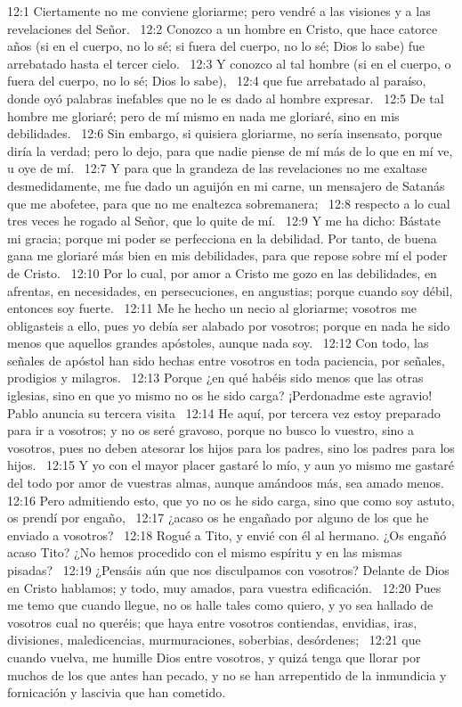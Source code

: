 12:1 Ciertamente no me conviene gloriarme; pero vendré a las visiones y a las revelaciones del Señor.  
12:2 Conozco a un hombre en Cristo, que hace catorce años (si en el cuerpo, no lo sé; si fuera del cuerpo, no lo sé; Dios lo sabe) fue arrebatado hasta el tercer cielo.  
12:3 Y conozco al tal hombre (si en el cuerpo, o fuera del cuerpo, no lo sé; Dios lo sabe),  
12:4 que fue arrebatado al paraíso, donde oyó palabras inefables que no le es dado al hombre expresar.  
12:5 De tal hombre me gloriaré; pero de mí mismo en nada me gloriaré, sino en mis debilidades.  
12:6 Sin embargo, si quisiera gloriarme, no sería insensato, porque diría la verdad; pero lo dejo, para que nadie piense de mí más de lo que en mí ve, u oye de mí.  
12:7 Y para que la grandeza de las revelaciones no me exaltase desmedidamente, me fue dado un aguijón en mi carne, un mensajero de Satanás que me abofetee, para que no me enaltezca sobremanera;  
12:8 respecto a lo cual tres veces he rogado al Señor, que lo quite de mí.  
12:9 Y me ha dicho: Bástate mi gracia; porque mi poder se perfecciona en la debilidad. Por tanto, de buena gana me gloriaré más bien en mis debilidades, para que repose sobre mí el poder de Cristo.  
12:10 Por lo cual, por amor a Cristo me gozo en las debilidades, en afrentas, en necesidades, en persecuciones, en angustias; porque cuando soy débil, entonces soy fuerte.  
12:11 Me he hecho un necio al gloriarme; vosotros me obligasteis a ello, pues yo debía ser alabado por vosotros; porque en nada he sido menos que aquellos grandes apóstoles, aunque nada soy.  
12:12 Con todo, las señales de apóstol han sido hechas entre vosotros en toda paciencia, por señales, prodigios y milagros.  
12:13 Porque ¿en qué habéis sido menos que las otras iglesias, sino en que yo mismo no os he sido carga? ¡Perdonadme este agravio!  
Pablo anuncia su tercera visita  
12:14 He aquí, por tercera vez estoy preparado para ir a vosotros; y no os seré gravoso, porque no busco lo vuestro, sino a vosotros, pues no deben atesorar los hijos para los padres, sino los padres para los hijos.  
12:15 Y yo con el mayor placer gastaré lo mío, y aun yo mismo me gastaré del todo por amor de vuestras almas, aunque amándoos más, sea amado menos.  
12:16 Pero admitiendo esto, que yo no os he sido carga, sino que como soy astuto, os prendí por engaño,  
12:17 ¿acaso os he engañado por alguno de los que he enviado a vosotros?  
12:18 Rogué a Tito, y envié con él al hermano. ¿Os engañó acaso Tito? ¿No hemos procedido con el mismo espíritu y en las mismas pisadas?  
12:19 ¿Pensáis aún que nos disculpamos con vosotros? Delante de Dios en Cristo hablamos; y todo, muy amados, para vuestra edificación.  
12:20 Pues me temo que cuando llegue, no os halle tales como quiero, y yo sea hallado de vosotros cual no queréis; que haya entre vosotros contiendas, envidias, iras, divisiones, maledicencias, murmuraciones, soberbias, desórdenes;  
12:21 que cuando vuelva, me humille Dios entre vosotros, y quizá tenga que llorar por muchos de los que antes han pecado, y no se han arrepentido de la inmundicia y fornicación y lascivia que han cometido. 
